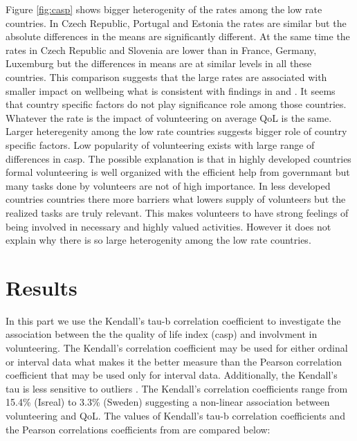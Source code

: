 \documentclass[10pt, letterpaper]{article}
\begin{document}
\begin{spacing}{1.4}
Figure \ref{fig:casp} shows bigger heterogenity of the rates among the low rate countries. In Czech Republic, Portugal and Estonia the rates are similar but the absolute differences in the means are significantly different. At the same time the rates in Czech Republic and Slovenia are lower than in France, Germany, Luxemburg but the differences in means are at similar levels in all these countries. This comparison suggests that the large rates are associated with smaller impact on wellbeing what is consistent with findings in \citet{haski09} and \citet{plagnol10}. It seems that country specific factors do not play significance role among those countries. Whatever the rate is the impact of volunteering on average QoL is the same. Larger heteregenity  among the low rate countries suggests bigger role of country specific factors. Low popularity of volunteering exists with large range of differences in casp. The possible explanation is that in highly developed countries formal volunteering is well organized with the efficient help from governmant but many tasks done by volunteers are not of high importance. In less developed countries countries there more barriers what lowers supply of volunteers but the realized tasks are truly relevant. This makes volunteers to have strong feelings of being involved in necessary and highly valued activities. However it does not explain why there is so large heterogenity among the low rate countries.   



\section{Results}

In this part we use the Kendall's tau-b correlation coefficient to investigate the association between the the quality of life index (casp) and involvment in volunteering. The Kendall's correlation coefficient may be used for either ordinal or interval data what makes it the better measure than the Pearson correlation coefficient that may be used only for interval data. Additionally, the Kendall's tau is less sensitive to outliers  \citet{khamis08}. The Kendall's correlation coefficients range from 15.4\% (Isreal) to 3.3\% (Sweden) suggesting a non-linear association between volunteering and QoL. The values of Kendall's tau-b correlation coefficients and the Pearson correlations coefficients from \citet{haski09} are compared below: 



\end{spacing}
\end{document}
